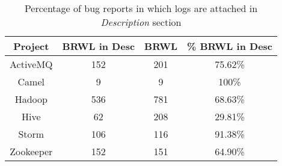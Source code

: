 \begin{table}[h!]
	\centering
	\begin{tabular}{||c c c c||} 
	 \hline
		 Project   & BRWL in Desc 		  	   & BRWL 	  & \% BRWL in Desc \\ [0.5ex] 
		 \hline\hline
		 ActiveMQ  & 152     				   & 201      & 75.62\% \\
		 Camel     & 9      				   & 9	  	  & 100\%   \\
		 Hadoop    & 536     				   & 781  	  & 68.63\% \\ 
		 Hive 	   & 62     				   & 208 	  & 29.81\% \\
		 Storm 	   & 106     				   & 116 	  & 91.38\% \\
		 Zookeeper & 152     				   & 151      & 64.90\% \\ [1ex]
	 \hline
	\end{tabular}
	\caption{Percentage of bug reports in which logs are attached in \textit{Description} section}
\label{table:2}
\end{table}
